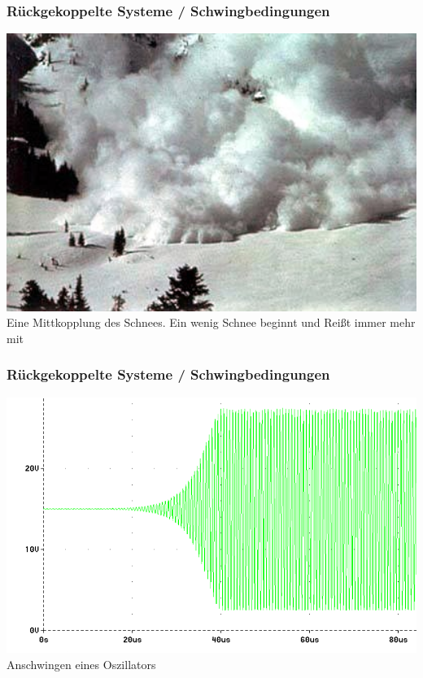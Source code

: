 \begin{frame}
    \frametitle{Rückgekoppelte Systeme / Schwingbedingungen}
        \begin{center}
        \includegraphics[width=1\textwidth]{a07/Lawine.jpg}
        \tiny \hyperlink{refs}{\cite{wm}} \\
     	\large Eine Mittkopplung des Schnees. Ein wenig Schnee beginnt und Reißt immer mehr mit
     \end{center}
\end{frame}

\begin{frame}
    \frametitle{Rückgekoppelte Systeme / Schwingbedingungen}
    \begin{center}
        \includegraphics[width=1\textwidth]{a07/Oszillator_Anschwingen.png}
        \tiny \hyperlink{refs}{\cite{wm}} \\[3em]
     	\large Anschwingen eines Oszillators
     \end{center}
\end{frame}

